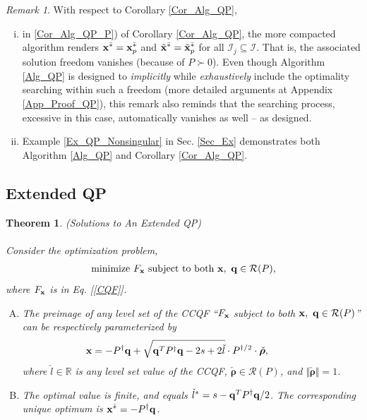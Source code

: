 \documentclass[9pt,twocolumn,twoside,lineno]{pnas-new-1}
\newcommand{\beq}{\begin{eqnarray}}
\newcommand{\eeq}{\end{eqnarray}}
\newcommand{\bfx}{{\bf x}}
\newcommand{\bfq}{{\bf q}}
\newcommand{\bfrho}{{\boldsymbol \rho}}
\newcommand{\real}{\mathbb{R}}
\newcommand{\calI}{{\mathcal I}}
\newcommand{\calR}{{\mathcal R}}
\newtheorem{theorem}{Theorem}[section]
\theoremstyle{remark}
\newtheorem{remark}{Remark}[section]
\begin{document}
\begin{remark} With respect to Corollary \ref{Cor_Alg_QP},
\begin{enumerate}[i)]
\item\label{Rem_Cor_Alg_P_Nonsingular} in \ref{Cor_Alg_QP_P}) of Corollary \ref{Cor_Alg_QP}, the more compacted algorithm renders $\bfx^{\bar *}=\bfx_p^{\bar *}$ and $\tilde\bfx^{\bar *}=\tilde\bfx_p^{\bar *}$ for all $\calI_j\subseteq\calI$. That is, the associated solution freedom vanishes (because of $P\succ 0$). Even though Algorithm \ref{Alg_QP} is designed to \textit{implicitly} while \textit{exhaustively} include the optimality searching within such a freedom (more detailed arguments at Appendix \ref{App_Proof_QP}), this remark also reminds that the searching process, excessive in this case, automatically vanishes as well -- as designed.
\item Example \ref{Ex_QP_Nonsingular} in Sec. \ref{Sec_Ex} demonstrates both Algorithm \ref{Alg_QP} and Corollary \ref{Cor_Alg_QP}.
\end{enumerate}
\label{Rem_Cor_Alg}
\end{remark}

\vspace{-0.3cm}
\subsection{Extended QP}
\label{Subsec_Extended_QP}
\begin{theorem} (Solutions to An Extended QP)\\
\\Consider the optimization problem,
\beq
\mbox{minimize}~F_\bfx~\mbox{subject to both}~\bfx,~\bfq\in\calR(P),
\label{Problem_Extended_QP}
\eeq
where $F_\bfx$ is in Eq. {\rm[\ref{CQF}]}.
\begin{enumerate}[A)]
\item\label{Thm_Extended_QP_Preimage} The preimage of any level set of the CCQF ``$F_\bfx$ subject to both $\bfx,~\bfq\in\calR(P)$'' can be respectively parameterized by
    \beq
    \bfx=-P^{\dagger}\bfq+\sqrt{\bfq^TP^\dagger\bfq-2s+2\check l}\cdot P^{\dagger/2}\cdot \check \bfrho,~~~~~~~~~
    \label{Thm_Extended_QP_Solutions}
    \eeq
    where $\check l\in\real$ is any level set value of the CCQF, $\check\bfrho\in \calR(P)$, and $\Vert\check\bfrho\Vert=1$.
\item\label{Thm_Extended_QP_Optimality} The optimal value is finite, and equals $\check l^*=s-\bfq^TP^\dagger\bfq/2$. The corresponding unique optimum is $\bfx^{\hat *}=-P^\dagger\bfq$.
\end{enumerate}
\label{Thm_Extended_QP}
\end{theorem}
\end{document}
